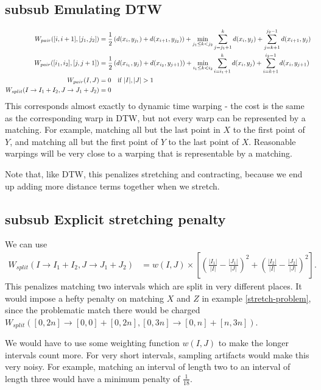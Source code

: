 \subsection{subsub Emulating DTW}
\begin{align*}
W_{pair}([i,i+1], [j_1,j_2]) &= \frac{1}{2}\left(d(x_i,y_{j_1}) +
d(x_{i+1}, y_{j_2})\right) + \min_{j_1 \le k < j_2} \sum_{j=j_1 + 1}^k
d(x_i, y_j) + \sum_{j=k+1}^{j_2 - 1} d(x_{i+1}, y_j)\\
W_{pair}([i_1,i_2], [j,j+1]) &= \frac{1}{2}\left(d(x_{i_1},y_j) +
d(x_{i_2}, y_{j+1})\right) + \min_{i_1 \le k < i_2} \sum_{i=i_1 + 1}^k
d(x_i, y_j) + \sum_{i=k+1}^{i_2 - 1} d(x_{i}, y_{j+1})\\
W_{pair}(I, J) &= 0 \mbox{\quad if } |I|,|J| > 1 \\
W_{split}(I\to I_1 + I_2, J\to J_1 + J_2) &= 0
\end{align*}
This corresponds almost exactly to dynamic time warping - the cost is
the same as the corresponding warp in DTW, but not every warp can be
represented by a matching. For example, matching all but the last
point in $X$ to the first point of $Y$, and matching all but the first
point of $Y$ to the last point of $X$. Reasonable warpings will be
very close to a warping that is representable by a matching.

Note that, like DTW, this penalizes stretching and contracting, because we end up
adding more distance terms together when we stretch.

\subsection{subsub Explicit stretching penalty}
We can use
\begin{align*}
W_{split}(I\to I_1 + I_2, J\to J_1 + J_2) &= w(I,J) \times \left[\left( \frac{|I_1|}{|I|} - \frac{|J_1|}{|J|}\right)^2 +
\left( \frac{|I_2|}{|I|} - \frac{|J_2|}{|J|}\right)^2 \right].
\end{align*}
This penalizes matching two intervals which are split in very
different places. It would impose a hefty penalty on matching $X$ and
$Z$ in example \ref{stretch-problem}, since the problematic match
there would be charged $W_{split}([0,2n]\to [0,0] + [0,2n], [0,3n] \to
[0,n] + [n,3n])$.

We would have to use some weighting function $w(I,J)$ to make the
longer intervals count more. For very short intervals, sampling
artifacts would make this very noisy. For example, matching an
interval of length two to an interval of length three would have a
minimum penalty of $\frac{1}{18}$.

